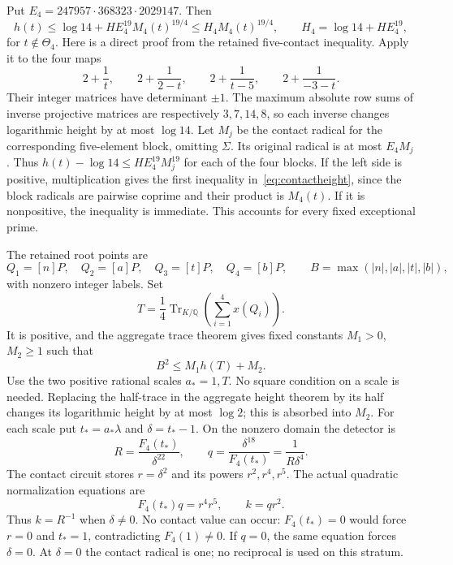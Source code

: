 \documentclass[11pt,a4paper]{article}
\newcommand{\Q}{\mathbb Q}\newcommand{\Z}{\mathbb Z}\newcommand{\HH}{\mathcal H}
\DeclareMathOperator{\Tr}{Tr}\DeclareMathOperator{\Nm}{Nm}
\begin{document}
Put $E_4=247957\cdot368323\cdot2029147$. Then
\begin{equation}\label{eq:contactheight}
 h(t)\le\log14+HE_4^{19}M_4(t)^{19/4}
       \le H_4M_4(t)^{19/4},\qquad
 H_4=\log14+HE_4^{19},
\end{equation}
for $t\notin\Theta_4$. Here is a direct proof from the retained
five-contact inequality. Apply it to the four maps
\[
 2+\frac1t,\qquad 2+\frac1{2-t},\qquad
 2+\frac1{t-5},\qquad2+\frac1{-3-t}.
\]
Their integer matrices have determinant $\pm1$. The maximum absolute
row sums of inverse projective matrices are respectively $3,7,14,8$,
so each inverse changes logarithmic height by at most $\log14$.
Let $M_j$ be the contact radical for the corresponding five-element
block, omitting $\Sigma$. Its original radical is at most $E_4M_j$.
Thus $h(t)-\log14\le HE_4^{19}M_j^{19}$ for each of the four blocks.
If the left side is positive, multiplication gives the first inequality
in~\eqref{eq:contactheight}, since the block radicals are pairwise
coprime and their product is $M_4(t)$. If it is nonpositive, the
inequality is immediate. This accounts for every fixed exceptional prime.

The retained root points are
\[
 Q_1=[n]P,\quad Q_2=[a]P,\quad Q_3=[t]P,\quad Q_4=[b]P,
 \qquad B=\max(|n|,|a|,|t|,|b|),
\]
with nonzero integer labels. Set
\[
 T=\frac14\Tr_{K/\Q}\left(\sum_{i=1}^4x(Q_i)\right).
\]
It is positive, and the aggregate trace theorem gives fixed constants
$M_1>0$, $M_2\ge1$ such that
\begin{equation}\label{eq:aggregate}
                         B^2\le M_1h(T)+M_2.
\end{equation}
Use the two positive rational scales $a_*=1,T$. No square condition
on a scale is needed. Replacing the half-trace in the aggregate
height theorem by its half changes its logarithmic height by at
most $\log2$; this is absorbed into $M_2$.
For each scale put $t_*=a_*\lambda$ and $\delta=t_*-1$.
On the nonzero domain the detector is
\begin{equation}\label{eq:detector}
 R=\frac{F_4(t_*)}{\delta^{22}},\qquad
 q=\frac{\delta^{18}}{F_4(t_*)}=\frac1{R\delta^4}.
\end{equation}
The contact circuit stores $r=\delta^2$ and its powers $r^2,r^4,r^5$.
The actual quadratic normalization equations are
\begin{equation}\label{eq:clearing}
                         F_4(t_*)q=r^4r^5,\qquad k=qr^2.
\end{equation}
Thus $k=R^{-1}$ when $\delta\ne0$. No contact value can occur:
$F_4(t_*)=0$ would force $r=0$ and $t_*=1$, contradicting $F_4(1)\ne0$.
If $q=0$, the same equation forces $\delta=0$. At $\delta=0$ the
contact radical is one; no reciprocal is used on this stratum.
\end{document}
